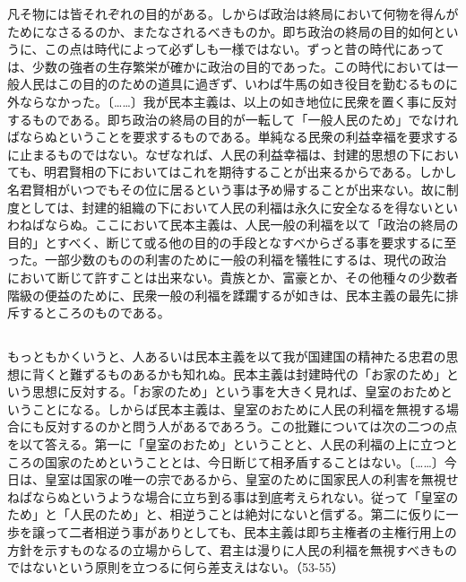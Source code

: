 凡そ物には皆それぞれの目的がある。しからば政治は終局において何物を得んがためになさるるのか、またなされるべきものか。即ち政治の終局の目的如何というに、この点は時代によって必ずしも一様ではない。ずっと昔の時代にあっては、少数の強者の生存繁栄が確かに政治の目的であった。この時代においては一般人民はこの目的のための道具に過ぎず、いわば牛馬の如き役目を勤むるものに外ならなかった。〔……〕我が民本主義は、以上の如き地位に民衆を置く事に反対するものである。即ち政治の終局の目的が一転して「一般人民のため」でなければならぬということを要求するものである。単純なる民衆の利益幸福を要求するに止まるものではない。なぜなれば、人民の利益幸福は、封建的思想の下においても、明君賢相の下においてはこれを期待することが出来るからである。しかし名君賢相がいつでもその位に居るという事は予め帰することが出来ない。故に制度としては、封建的組織の下において人民の利福は永久に安全なるを得ないといわねばならぬ。ここにおいて民本主義は、人民一般の利福を以て「政治の終局の目的」とすべく、断じて或る他の目的の手段となすべからざる事を要求するに至った。一部少数のものの利害のために一般の利福を犠牲にするは、現代の政治において断じて許すことは出来ない。貴族とか、富豪とか、その他種々の少数者階級の便益のために、民衆一般の利福を蹂躙するが如きは、民本主義の最先に排斥するところのものである。

\subsection{}

もっともかくいうと、人あるいは民本主義を以て我が国建国の精神たる忠君の思想に背くと難ずるものあるかも知れぬ。民本主義は封建時代の「お家のため」という思想に反対する。「お家のため」という事を大きく見れば、皇室のおためということになる。しからば民本主義は、皇室のおために人民の利福を無視する場合にも反対するのかと問う人があるであろう。この批難については次の二つの点を以て答える。第一に「皇室のおため」ということと、人民の利福の上に立つところの国家のためということとは、今日断じて相矛盾することはない。〔……〕今日は、皇室は国家の唯一の宗であるから、皇室のために国家民人の利害を無視せねばならぬというような場合に立ち到る事は到底考えられない。従って「皇室のため」と「人民のため」と、相逆うことは絶対にないと信ずる。第二に仮りに一歩を譲って二者相逆う事がありとしても、民本主義は即ち主権者の主権行用上の方針を示すものなるの立場からして、君主は漫りに人民の利福を無視すべきものではないという原則を立つるに何ら差支えはない。（53-55）

\subsection{}

